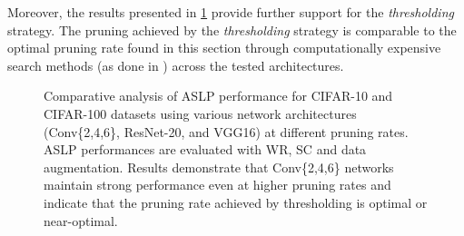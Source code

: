 Moreover, the results presented in \cref{fig:chap2:sparsity_impact} provide
further support for the \textit{thresholding} strategy. The pruning achieved by
the \textit{thresholding} strategy is comparable to the optimal pruning rate
found in this section through computationally expensive search methods (as done
in \cite{DBLP:conf/cvpr/RamanujanWKFR20}) across the tested architectures.

\begin{figure}[htbp]
\centering
{}
  \caption{Comparative analysis of ASLP performance for CIFAR-10 and CIFAR-100
  datasets using various network architectures (Conv\{2,4,6\}, ResNet-20, and
  VGG16) at different pruning rates. ASLP performances are evaluated with
  \ac{WR}, \ac{SC} and data augmentation. Results demonstrate that Conv\{2,4,6\}
  networks maintain strong performance even at higher pruning rates and indicate
  that the pruning rate achieved by thresholding is optimal or near-optimal.}
\label{fig:chap2:sparsity_impact}
\end{figure}

